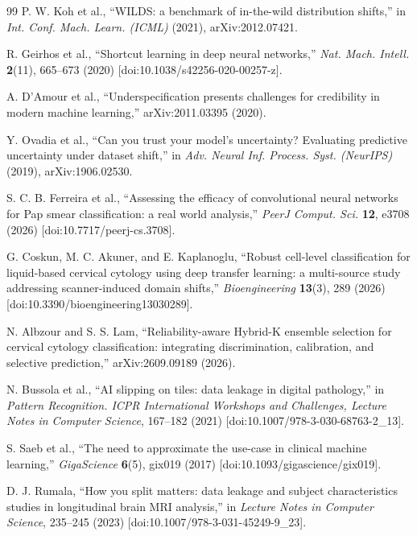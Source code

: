 \documentclass[12pt,letterpaper]{article}
\begin{document}
{\begin{thebibliography}{99}
P. W. Koh et al., ``WILDS: a benchmark of in-the-wild distribution shifts,'' in \textit{Int. Conf. Mach. Learn. (ICML)} (2021), arXiv:2012.07421.

R. Geirhos et al., ``Shortcut learning in deep neural networks,'' \textit{Nat. Mach. Intell.} \textbf{2}(11), 665--673 (2020) [doi:10.1038/s42256-020-00257-z].

A. D'Amour et al., ``Underspecification presents challenges for credibility in modern machine learning,'' arXiv:2011.03395 (2020).

Y. Ovadia et al., ``Can you trust your model's uncertainty? Evaluating predictive uncertainty under dataset shift,'' in \textit{Adv. Neural Inf. Process. Syst. (NeurIPS)} (2019), arXiv:1906.02530.

S. C. B. Ferreira et al., ``Assessing the efficacy of convolutional neural networks for Pap smear classification: a real world analysis,'' \textit{PeerJ Comput. Sci.} \textbf{12}, e3708 (2026) [doi:10.7717/peerj-cs.3708].

G. Coskun, M. C. Akuner, and E. Kaplanoglu, ``Robust cell-level classification for liquid-based cervical cytology using deep transfer learning: a multi-source study addressing scanner-induced domain shifts,'' \textit{Bioengineering} \textbf{13}(3), 289 (2026) [doi:10.3390/bioengineering13030289].

N. Albzour and S. S. Lam, ``Reliability-aware Hybrid-K ensemble selection for cervical cytology classification: integrating discrimination, calibration, and selective prediction,'' arXiv:2609.09189 (2026).

N. Bussola et al., ``AI slipping on tiles: data leakage in digital pathology,'' in \textit{Pattern Recognition. ICPR International Workshops and Challenges, Lecture Notes in Computer Science}, 167--182 (2021) [doi:10.1007/978-3-030-68763-2\_13].

S. Saeb et al., ``The need to approximate the use-case in clinical machine learning,'' \textit{GigaScience} \textbf{6}(5), gix019 (2017) [doi:10.1093/gigascience/gix019].

D. J. Rumala, ``How you split matters: data leakage and subject characteristics studies in longitudinal brain MRI analysis,'' in \textit{Lecture Notes in Computer Science}, 235--245 (2023) [doi:10.1007/978-3-031-45249-9\_23].


\end{thebibliography}}
\end{document}
